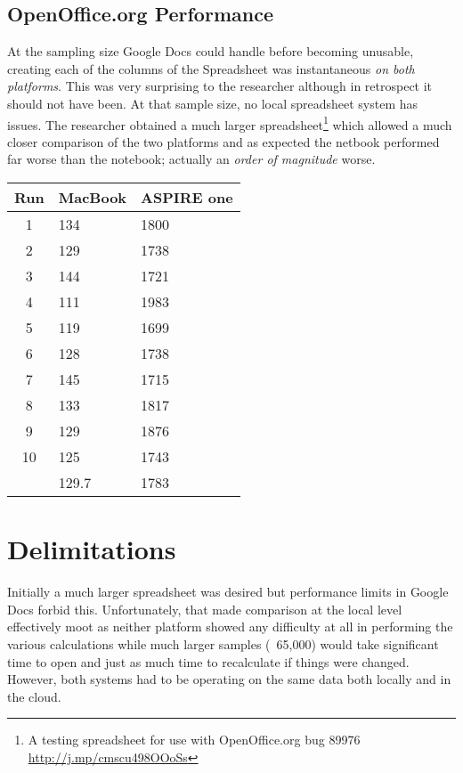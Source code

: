 \subsection{OpenOffice.org Performance}

At the sampling size Google Docs could handle before becoming unusable, creating
each of the columns of the Spreadsheet was instantaneous \emph{on both
  platforms}.  This was very surprising to the researcher although in retrospect
it should not have been.  At that sample size, no local spreadsheet system has
issues.  The researcher obtained a much larger spreadsheet\footnote{A testing
  spreadsheet for use with OpenOffice.org bug 89976
  \url{http://j.mp/cmscu498OOoSs}} which allowed a much closer comparison of the
two platforms and as expected the netbook performed far worse than the notebook;
actually an \emph{order of magnitude} worse.

\begin{tabular}{| c | l | l |}
  \hline
  Run  & MacBook & ASPIRE one \\ \hline
  1    & 134     & 1800       \\ \hline
  2    & 129     & 1738       \\ \hline
  3    & 144     & 1721       \\ \hline
  4    & 111     & 1983       \\ \hline
  5    & 119     & 1699       \\ \hline
  6    & 128     & 1738       \\ \hline
  7    & 145     & 1715       \\ \hline
  8    & 133     & 1817       \\ \hline
  9    & 129     & 1876       \\ \hline
  10   & 125     & 1743       \\ \hline
       & 129.7   & 1783       \\
  \hline
\end{tabular}

\section{Delimitations}


Initially a much larger spreadsheet was desired but performance limits in Google
Docs forbid this.  Unfortunately, that made comparison at the local level
effectively moot as neither platform showed any difficulty at all in performing
the various calculations while much larger samples (~65,000) would take
significant time to open and just as much time to recalculate if things were
changed.  However, both systems had to be operating on the same data both
locally and in the cloud.

